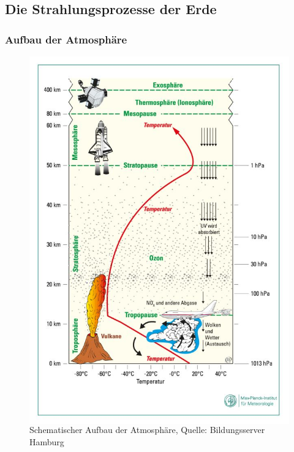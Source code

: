 \subsection{Die Strahlungsprozesse der Erde}

\begin{frame}
	\frametitle{Aufbau der Atmosphäre}
	\begin{figure}
		\centering
    \begin{columns}
		    \includegraphics[width=.85\linewidth]{bilder/atmosphaere-stockwerkaufbau_bildungsserver_hh.jpg}
        \caption{Schematischer Aufbau der Atmosphäre, Quelle: Bildungsserver Hamburg}
    \end{columns}
	\end{figure}


\end{frame}
